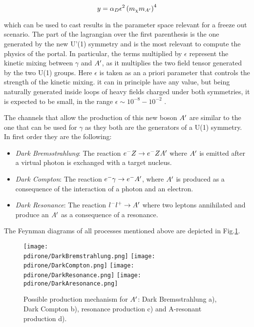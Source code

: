     \begin{equation}
      \label{eq:dmplane-y-dp}
      y = \alpha_D \epsilon^2 \left(m_{\chi}m_{A'} \right)^4 
    \end{equation}

which can be used to cast results in the parameter space relevant for a freeze out scenario.
The part of the lagrangian over the first parenthesis is the one generated by the new U'(1) symmetry and is the most relevant to compute the physics of the portal. In particular, the terms multiplied by $\epsilon$ represent the kinetic mixing between $\gamma$ and $A'$, as it multiplies the two field tensor generated by the two U(1) groups. Here $\epsilon$ is taken as an a priori parameter that controls the strength of the kinetic mixing. it can in principle have any value, but being naturally generated inside loops of heavy fields charged under both symmetries, it is expected to be small, in the range $\epsilon \sim 10^{-8} - 10^{-2}$ \cite{jdb}. 

The channels that allow the production of this new boson $A'$ are similar to the one that can be used for $\gamma$ as they both are the generators of a U(1) symmetry. In first order they are the following:

\begin{itemize}
\item \textit{Dark Bremsstrahlung}: The reaction $e^- Z \to e^- Z A'$ where $A'$ is emitted after a virtual photon is exchanged with a target nucleus.
\item \textit{Dark Compton}: The reaction $e^- \gamma \to e^- A'$, where $A'$ is produced as a consequence of the interaction of a photon and an electron.
\item \textit{Dark Resonance}: The reaction $l^- l^+ \to A'$ where two leptons annihilated and produce an $A'$ as a consequence of a resonance.
\end{itemize}

The Feynman diagrams of all processes mentioned above are depicted in Fig.\ref{fig:dm-production-mechanism}.

\begin{figure}
\centering
\texttt{[image: \\pdirone/DarkBremstrahlung.png]}
\texttt{[image: \\pdirone/DarkCompton.png]}
\texttt{[image: \\pdirone/DarkResonance.png]}
\texttt{[image: \\pdirone/DarkAresonance.png]}
\caption{Possible production mechanism for $A'$: Dark Bremsstrahlung a), Dark Compton b), resonance production c) and A-resonant production d).}
\label{fig:dm-production-mechanism}
\end{figure}

